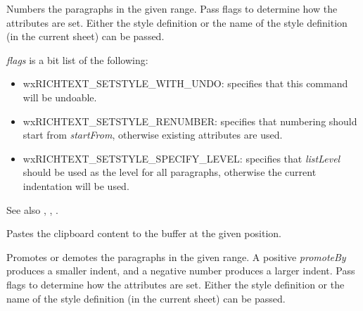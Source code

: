 
Numbers the paragraphs in the given range. Pass flags to determine how the attributes are set.
Either the style definition or the name of the style definition (in the current sheet) can be passed.

{\it flags} is a bit list of the following:

\begin{itemize}\itemsep=0pt
\item wxRICHTEXT\_SETSTYLE\_WITH\_UNDO: specifies that this command will be undoable.
\item wxRICHTEXT\_SETSTYLE\_RENUMBER: specifies that numbering should start from {\it startFrom}, otherwise existing attributes are used.
\item wxRICHTEXT\_SETSTYLE\_SPECIFY\_LEVEL: specifies that {\it listLevel} should be used as the level for all paragraphs, otherwise the current indentation will be used.
\end{itemize}

See also , , .

\label{wxrichtextbufferpastefromclipboard}


Pastes the clipboard content to the buffer at the given position.

\label{wxrichtextbufferpromotelist}



Promotes or demotes the paragraphs in the given range. A positive {\it promoteBy} produces a smaller indent, and a negative number
produces a larger indent. Pass flags to determine how the attributes are set.
Either the style definition or the name of the style definition (in the current sheet) can be passed.

